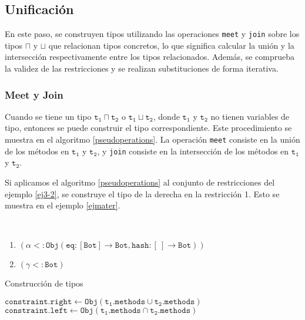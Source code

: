\subsection{Unificación}
En este paso, se construyen tipos utilizando las operaciones \texttt{meet} y \texttt{join} sobre los tipos $\sqcap$ y $\sqcup$ que relacionan tipos concretos, lo que significa calcular la unión y la intersección respectivamente entre los tipos relacionados. Además, se comprueba la validez de las restricciones y se realizan substituciones de forma iterativa.

\subsubsection{Meet y Join}
Cuando se tiene un tipo $\mathtt{t_1 \sqcap t_2}$ o $\mathtt{t_1 \sqcup t_2}$, donde $\mathtt{t_1}$ y $\mathtt{t_2}$ no tienen variables de tipo, entonces se puede construir el tipo correspondiente. Este procedimiento se muestra en el algoritmo \ref{pseudoperations}. La operación \texttt{meet} consiste en la unión de los métodos en $\mathtt{t_1}$ y $\mathtt{t_2}$, y \texttt{join} consiste en la intersección de los métodos en $\mathtt{t_1}$ y $\mathtt{t_2}$.

Si aplicamos el algoritmo \ref{pseudoperations} al conjunto de restricciones del ejemplo \ref{ej3-2}, se construye el tipo de la derecha en la restricción 1. Esto se muestra en el ejemplo \ref{ejmater}.
\clearpage
\begin{ej}\
  \normalfont
  \label{ejmater}
  \begin{enumerate}
    \item $\mathtt{(\alpha <: Obj(eq : [Bot] \rightarrow Bot, hash : [\ ] \rightarrow Bot))}$
    \item $\mathtt{(\gamma <: Bot)}$
  \end{enumerate}
\end{ej}


\begin{algorithm}\captionsetup{labelsep=newline}
  \centering
  \caption{Construcción de tipos}
  \label{pseudoperations}
    \begin{algorithmic}[1]
                \State $\mathtt{constraint.right\gets Obj(t_1.methods \cup t_2.methods)}$
              \EndCase
            \EndSwitch
                \State $\mathtt{constraint.left\gets Obj(t_1.methods \cap t_2.methods)}$
              \EndCase
            \EndSwitch
          \EndFor
      \EndFunction
    \end{algorithmic}
\end{algorithm}

